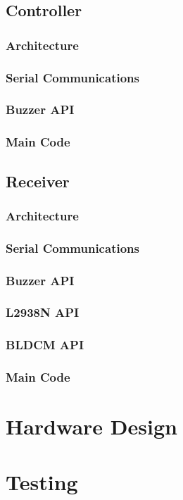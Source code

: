 \documentclass [11pt]{article}
\begin{document}
\subsection{Controller}
\subsubsection{Architecture}
\subsubsection{Serial Communications}
\subsubsection{Buzzer API}
\subsubsection{Main Code}

\subsection{Receiver}
\subsubsection{Architecture}
\subsubsection{Serial Communications}
\subsubsection{Buzzer API}
\subsubsection{L2938N API}
\subsubsection{BLDCM API}
\subsubsection{Main Code}

\section{Hardware Design}
\section{Testing}
\end{document}
